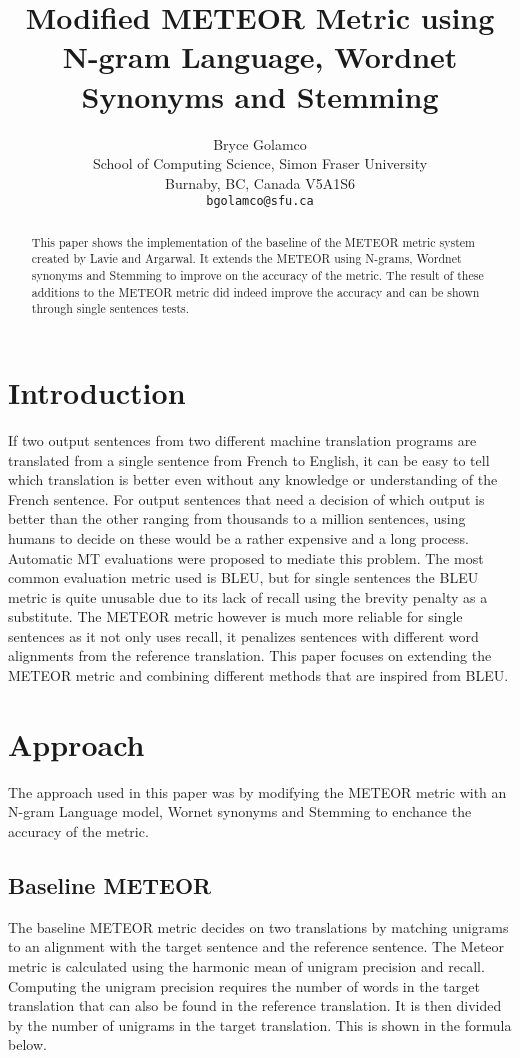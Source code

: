 \documentclass[11pt,letterpaper]{article}
\title{Modified METEOR Metric using N-gram Language, Wordnet Synonyms and Stemming}
\author{Bryce Golamco \\
  School of Computing Science, Simon Fraser University\\
	Burnaby, BC, Canada V5A1S6\\
  {\tt bgolamco@sfu.ca} \\}
\date{}
\begin{document}
\maketitle
\begin{abstract}
	This paper shows the implementation of the baseline of the METEOR metric system created by Lavie and Argarwal. It extends the METEOR using N-grams, Wordnet synonyms and Stemming to improve on the accuracy of the metric. The result of these additions to the METEOR metric did indeed improve the accuracy and can be shown through single sentences tests.

\end{abstract}

\section{Introduction}
	If two output sentences from two different machine translation programs are translated from a single sentence from French to English, it can be easy to tell which translation is better even without any knowledge or understanding of the French sentence. For output sentences that need a decision of which output is better than the other ranging from thousands to a million sentences, using humans to decide on these would be a rather expensive and a long process. Automatic MT evaluations were proposed to mediate this problem. The most common evaluation metric used is BLEU, but for single sentences the BLEU metric is quite unusable due to its lack of recall using the brevity penalty as a substitute. The METEOR metric however is much more reliable for single sentences as it not only uses recall, it penalizes sentences with different word alignments from the reference translation. This paper focuses on extending the METEOR metric and combining different methods that are inspired from BLEU.


\section{Approach}
	The approach used in this paper was by modifying the METEOR metric with an N-gram Language model, Wornet synonyms and Stemming to enchance the accuracy of the metric.
\subsection{Baseline METEOR}
	The baseline METEOR metric decides on two translations by matching unigrams to an alignment with the target sentence and the reference sentence. The Meteor metric is calculated using the harmonic mean of unigram precision and recall. Computing the unigram precision requires the number of words in the target translation that can also be found in the reference translation. It is then divided by the number of unigrams in the target translation. This is shown in the formula below.
\end{document}
